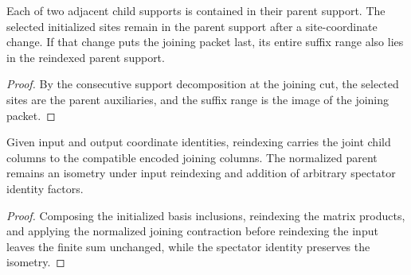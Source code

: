 \begin{lemma}
    \label{thm:mpu_actual_merging_support}
    \leanok
    Each of two adjacent child supports is contained in their parent support.
    The selected initialized sites remain in the parent support after a
    site-coordinate change. If that change puts the joining packet last,
    its entire suffix range also lies in the reindexed parent support.
\end{lemma}
\begin{proof}\leanok
    By the consecutive support decomposition at the joining cut, the selected
    sites are the parent auxiliaries, and the suffix range is the image
    of the joining packet.
\end{proof}

\begin{lemma}
    \label{thm:mpu_encoded_joint_columns}
    \leanok
    Given input and output coordinate identities, reindexing carries the
    joint child columns to the compatible encoded joining columns. The
    normalized parent remains an isometry under input reindexing and addition
    of arbitrary spectator identity factors.
\end{lemma}
\begin{proof}\leanok
    Composing the initialized basis inclusions, reindexing the matrix products, and applying
    the normalized joining contraction before reindexing the input leaves the finite
    sum unchanged, while the spectator identity preserves the isometry.
\end{proof}

